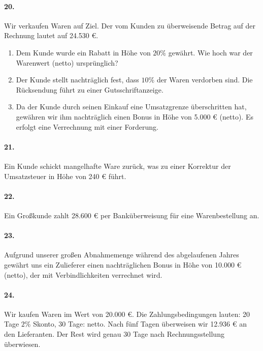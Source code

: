 \documentclass[paper=a4, fontsize=11pt]{scrartcl}
\numberwithin{equation}{section}
\numberwithin{figure}{section}
\numberwithin{table}{section}
\begin{document}
{\paragraph{20.}
Wir verkaufen Waren auf Ziel. Der vom Kunden zu überweisende Betrag auf der Rechnung lautet auf 24.530 €. \\

\begin{enumerate}
\item Dem Kunde wurde ein Rabatt in Höhe von $20 \%$ gewährt. Wie hoch war der Warenwert (netto) ursprünglich? \\
\item Der Kunde stellt nachträglich fest, dass $10 \%$ der Waren verdorben sind. Die Rücksendung führt zu einer Gutsschriftanzeige. \\
\item Da der Kunde durch seinen Einkauf eine Umsatzgrenze überschritten hat, gewähren wir ihm nachträglich einen Bonus in Höhe von 5.000 € (netto). Es erfolgt eine Verrechnung mit einer Forderung. \\
\end{enumerate}

\paragraph{21.}
Ein Kunde schickt mangelhafte Ware zurück, was zu einer Korrektur der Umsatzsteuer in Höhe von 240 € führt. \\

\paragraph{22.}
Ein Großkunde zahlt 28.600 € per Banküberweisung für eine Warenbestellung an. \\

\paragraph{23.}
Aufgrund unserer großen Abnahmemenge während des abgelaufenen Jahres gewährt uns ein Zulieferer einen nachträglichen Bonus in Höhe von 10.000 € (netto), der mit Verbindlichkeiten verrechnet wird. \\

\paragraph{24.}
Wir kaufen Waren im Wert von 20.000 €. Die Zahlungsbedingungen lauten: 20 Tage $2 \%$ Skonto, 30 Tage: netto. Nach fünf Tagen überweisen wir 12.936 € an den Lieferanten. Der Rest wird genau 30 Tage nach Rechnungsstellung überwiesen. \\

}
\end{document}
